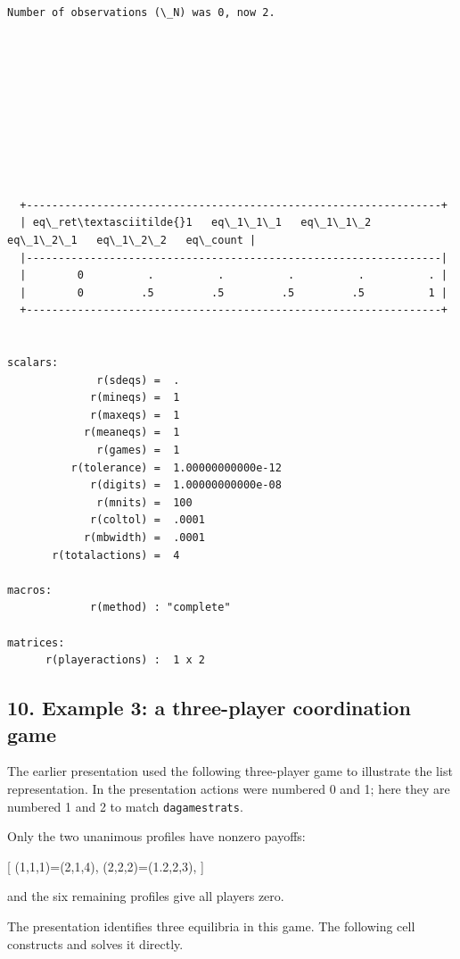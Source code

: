 \documentclass[11pt]{article}
\begin{document}
    \begin{Verbatim}[commandchars=\\\{\}]


Number of observations (\_N) was 0, now 2.










  +-----------------------------------------------------------------+
  | eq\_ret\textasciitilde{}1   eq\_1\_1\_1   eq\_1\_1\_2   eq\_1\_2\_1   eq\_1\_2\_2   eq\_count |
  |-----------------------------------------------------------------|
  |        0          .          .          .          .          . |
  |        0         .5         .5         .5         .5          1 |
  +-----------------------------------------------------------------+


scalars:
              r(sdeqs) =  .
             r(mineqs) =  1
             r(maxeqs) =  1
            r(meaneqs) =  1
              r(games) =  1
          r(tolerance) =  1.00000000000e-12
             r(digits) =  1.00000000000e-08
              r(mnits) =  100
             r(coltol) =  .0001
            r(mbwidth) =  .0001
       r(totalactions) =  4

macros:
             r(method) : "complete"

matrices:
      r(playeractions) :  1 x 2
    \end{Verbatim}

    \hypertarget{example-3-a-three-player-coordination-game}{%
\subsection{10. Example 3: a three-player coordination
game}\label{example-3-a-three-player-coordination-game}}

The earlier presentation used the following three-player game to
illustrate the list representation. In the presentation actions were
numbered 0 and 1; here they are numbered 1 and 2 to match
\texttt{dagamestrats}.

Only the two unanimous profiles have nonzero payoffs:

{[} \Pi(1,1,1)=(2,1,4), \qquad \Pi(2,2,2)=(1.2,2,3), {]}

and the six remaining profiles give all players zero.

The presentation identifies three equilibria in this game. The following
cell constructs and solves it directly.
\end{document}
